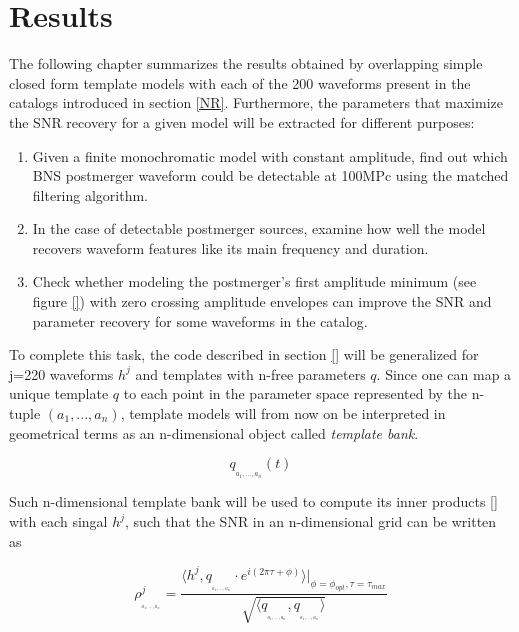 \chapter{Results}\label{res}

The following chapter summarizes the results obtained by overlapping simple closed form template models with each of the 200 waveforms present in the catalogs introduced in section \ref{NR}. Furthermore, the parameters that maximize the SNR recovery for a given model will be extracted for different purposes:

\begin{enumerate}
\item Given a finite monochromatic model with constant amplitude, find out which BNS postmerger waveform could be detectable at 100MPc using the matched filtering algorithm.

\item In the case of detectable postmerger sources, examine how well the model recovers waveform features like its main frequency and duration.

\item Check whether modeling the postmerger's first amplitude minimum (see figure \ref{}) with zero crossing amplitude envelopes can improve the SNR and parameter recovery for some waveforms in the catalog.

\end{enumerate}


To complete this task, the code described in section \ref{} will be generalized for j=220 waveforms $h^j$ and templates with n-free parameters $q$. Since one can map a unique template $q$ to each point in the parameter space represented by the n-tuple $(a_1,...,a_n)$, template models will from now on be interpreted in geometrical terms as an n-dimensional object called \textit{template bank}. 

\begin{equation}\label{ndim}
q_{_{a_1,...,a_n}}(t)
\end{equation}

Such n-dimensional template bank will be used to compute its inner products \ref{} with each singal $h^j$, such that the SNR in an n-dimensional grid can be written as 

\begin{equation}\label{pul}
\rho^j_{_{_{a_1,...,a_n}}} = \frac{\langle h^j, q_{_{_{a_1,...,a_n}}}\cdot e^{i(2\pi \tau+\phi)}\rangle \bigg\rvert_{\phi =\phi_{opt},\tau =\tau_{max}}}{\sqrt{\langle  q_{_{_{a_1,...,a_n}}},q_{_{_{a_1,...,a_n}}} \rangle}}
\end{equation}


